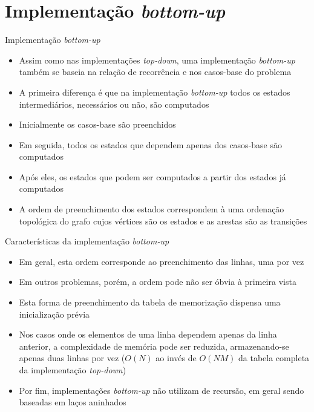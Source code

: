 \section{Implementação {\it bottom-up}}

\begin{frame}[fragile]{Implementação {\it bottom-up}}

    \begin{itemize}
        \item Assim como nas implementações \textit{top-down}, uma implementação \textit{bottom-up}
            também se baseia na relação de recorrência e nos casos-base do problema

        \item A primeira diferença é que na implementação \textit{bottom-up} todos os estados
            intermediários, necessários ou não, são computados

        \item Inicialmente os casos-base são preenchidos

        \item Em seguida, todos os estados que dependem apenas dos casos-base são computados

        \item Após eles, os estados que podem ser computados a partir dos estados já computados

        \item A ordem de preenchimento dos estados correspondem à uma ordenação topológica do
            grafo cujos vértices são os estados e as arestas são as transições
    \end{itemize}

\end{frame}

\begin{frame}[fragile]{Características da implementação {\it bottom-up}}

    \begin{itemize}
        \item Em geral, esta ordem corresponde ao preenchimento das linhas, uma por vez

        \item Em outros problemas, porém, a ordem pode não ser óbvia à primeira vista

        \item Esta forma de preenchimento da tabela de memorização dispensa uma inicialização
            prévia

        \item Nos casos onde os elementos de uma linha dependem apenas da linha anterior, a
            complexidade de memória pode ser reduzida, armazenando-se apenas duas linhas por
            vez ($O(N)$ ao invés de $O(NM)$ da tabela completa da implementação 
            \textit{top-down})

        \item Por fim, implementações \textit{bottom-up} não utilizam de recursão, em geral
            sendo baseadas em laços aninhados
    \end{itemize}

\end{frame}

